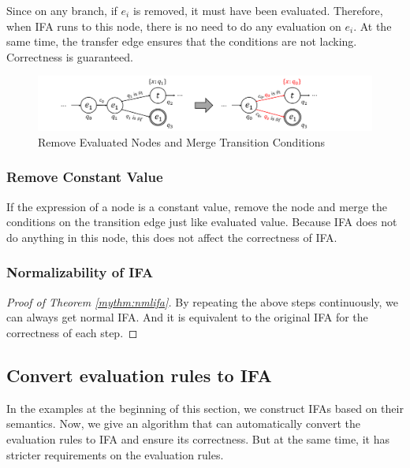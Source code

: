 Since on any branch, if $e_i$ is removed, it must have been evaluated. Therefore, when IFA runs to this node, there is no need to do any evaluation on $e_i$. At the same time, the transfer edge ensures that the conditions are not lacking. Correctness is guaranteed.

\begin{figure}[t]
    \centering
    \includegraphics[scale=0.25]{images/nmlifa/nmlifa-merge.png}
    \caption{Remove Evaluated Nodes and Merge Transition Conditions}
    \label{fig:nmlifa-merge}
\end{figure}

\subsubsection{Remove Constant Value}

If the expression of a node is a constant value, remove the node and merge the conditions on the transition edge just like evaluated value. Because IFA does not do anything in this node, this does not affect the correctness of IFA.

\subsubsection{Normalizability of IFA}

\begin{proof}[Proof of Theorem \ref{mythm:nmlifa}]
    By repeating the above steps continuously, we can always get normal IFA. And it is equivalent to the original IFA for the correctness of each step.
\end{proof}

\subsection{Convert evaluation rules to IFA}

In the examples at the beginning of this section, we construct IFAs based on their semantics. Now, we give an algorithm that can automatically convert the evaluation rules to IFA and ensure its correctness. But at the same time, it has stricter requirements on the evaluation rules.

